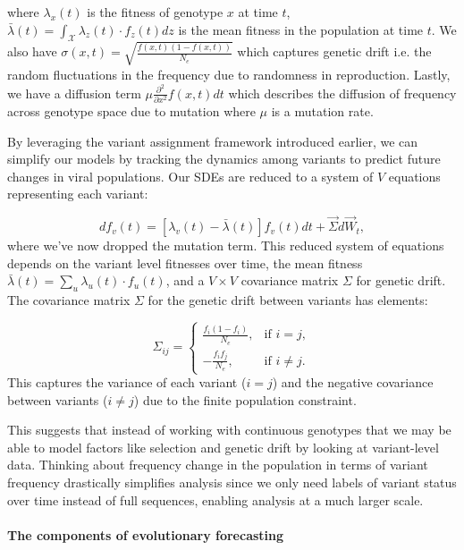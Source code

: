 where $\lambda_x(t)$ is the fitness of genotype $x$ at time $t$, $\bar{\lambda}(t) = \int_{\mathcal{X}} \lambda_z(t)\cdot f_z(t) dz$ is the mean fitness in the population at time $t$.
We also have $\sigma(x, t) = \sqrt{\frac{f(x,t) (1 - f(x,t))}{N_e}}$ which captures genetic drift i.e. the random fluctuations in the frequency due to randomness in reproduction.
Lastly, we have a diffusion term $\mu \frac{\partial^2 }{\partial x^2} f(x,t) dt$ which describes the diffusion of frequency across genotype space due to mutation where $\mu$ is a mutation rate.

By leveraging the variant assignment framework introduced earlier, we can simplify our models by tracking the dynamics among variants to predict future changes in viral populations.
Our SDEs are reduced to a system of $V$ equations representing each variant:

\begin{equation}
  df_v(t) = \left[\lambda_{v}(t) - \bar{\lambda}(t)\right] f_v(t) dt + \vec{\Sigma} d\vec{W}_{t},
\end{equation}
where we've now dropped the mutation term.
This reduced system of equations depends on the variant level fitnesses over time, the mean fitness $\bar{\lambda}(t) = \sum_{u} \lambda_u(t)\cdot f_u(t)$, and a $V \times V$ covariance matrix $\Sigma$ for genetic drift.
The covariance matrix $\Sigma$ for the genetic drift between variants has elements:

\begin{equation}
\Sigma_{ij} = \begin{cases}
  \frac{f_i (1 - f_i)}{N_e}, & \text{if } i = j, \\
  -\frac{f_i f_j}{N_e}, & \text{if } i \neq j.
\end{cases}
\end{equation}
This captures the variance of each variant ($i = j$) and the negative covariance between variants ($i \neq j$) due to the finite population constraint.

This suggests that instead of working with continuous genotypes that we may be able to model factors like selection and genetic drift by looking at variant-level data.
Thinking about frequency change in the population in terms of variant frequency drastically simplifies analysis since we only need labels of variant status over time instead of full sequences, enabling analysis at a much larger scale.

\paragraph{The components of evolutionary forecasting}

